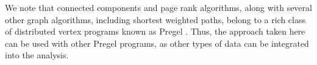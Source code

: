 We note that connected components and page rank algorithms, along with several other graph algorithms, including shortest weighted paths, belong to a rich class of distributed vertex programs known as Pregel \cite{pregel}.  Thus, the approach taken here can be used with other Pregel programs, as other types of data can be integrated into the analysis. 







